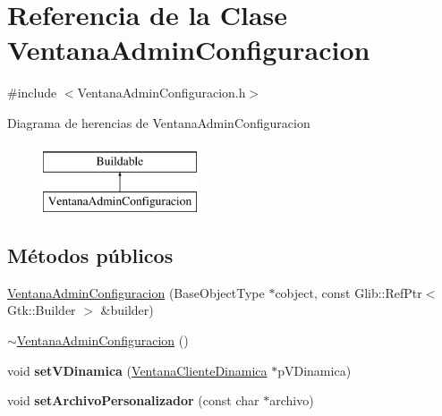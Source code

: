 \hypertarget{classVentanaAdminConfiguracion}{\section{\-Referencia de la \-Clase \-Ventana\-Admin\-Configuracion}
\label{classVentanaAdminConfiguracion}
}


{\ttfamily \#include $<$\-Ventana\-Admin\-Configuracion.\-h$>$}

\-Diagrama de herencias de \-Ventana\-Admin\-Configuracion\begin{figure}[H]
\begin{center}
\leavevmode
\includegraphics[height=2.000000cm]{classVentanaAdminConfiguracion}
\end{center}
\end{figure}
\subsection*{\-Métodos públicos}
\begin{DoxyCompactItemize}
\item 
\hyperlink{classVentanaAdminConfiguracion_afb00e4227ee8add67a68399d233245fa}{\-Ventana\-Admin\-Configuracion} (\-Base\-Object\-Type $\ast$cobject, const \-Glib\-::\-Ref\-Ptr$<$ \-Gtk\-::\-Builder $>$ \&builder)
\item 
\hyperlink{classVentanaAdminConfiguracion_a2988875649e645fc0a38ee185557bf51}{$\sim$\-Ventana\-Admin\-Configuracion} ()
\item 
\hypertarget{classVentanaAdminConfiguracion_ae785f6efe6da8d1db1e915c1f24a2848}{void {\bfseries set\-V\-Dinamica} (\hyperlink{classVentanaClienteDinamica}{\-Ventana\-Cliente\-Dinamica} $\ast$p\-V\-Dinamica)}\label{classVentanaAdminConfiguracion_ae785f6efe6da8d1db1e915c1f24a2848}

\item 
\hypertarget{classVentanaAdminConfiguracion_afe8827f119b32a96ace32db0fc5bff81}{void {\bfseries set\-Archivo\-Personalizador} (const char $\ast$archivo)}\label{classVentanaAdminConfiguracion_afe8827f119b32a96ace32db0fc5bff81}

\end{DoxyCompactItemize}


